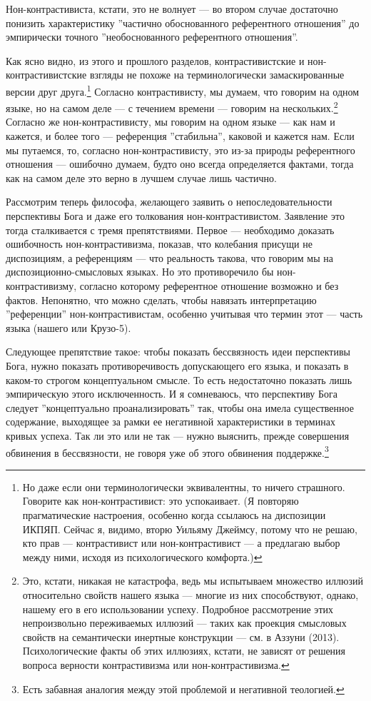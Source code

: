 \documentclass[11pt]{book}
\begin{document}
Нон-контрастивиста, кстати, это не волнует --- во втором случае достаточно понизить характеристику ''частично обоснованного референтного отношения'' до эмпирически точного ''необоснованного референтного отношения''.

Как ясно видно, из этого и прошлого разделов, контрастивистские и нон-контрастивистские взгляды не похоже на терминологически замаскированные версии друг друга.\footnote{Но даже если они терминологически эквивалентны, то ничего страшного. Говорите как нон-контрастивист: это успокаивает. (Я повторяю прагматические настроения, особенно когда ссылаюсь на диспозиции ИКПЯП. Сейчас я, видимо, вторю Уильяму Джеймсу, потому что не решаю, кто прав --- контрастивист или нон-контрастивист --- а предлагаю выбор между ними, исходя из психологического комфорта.)} Согласно контрастивисту, мы думаем, что говорим на одном языке, но на самом деле --- с течением времени --- говорим на нескольких.\footnote{Это, кстати, никакая не катастрофа, ведь мы испытываем множество иллюзий относительно свойств нашего языка --- многие из них способствуют, однако, нашему его в его использовании успеху. Подробное рассмотрение этих непроизвольно переживаемых иллюзий --- таких как проекция смысловых свойств на семантически инертные конструкции --- см. в Аззуни (2013). Психологические факты об этих иллюзиях, кстати, не зависят от решения вопроса верности контрастивизма или нон-контрастивизма.} Согласно же нон-контрастивисту, мы говорим на одном языке --- как нам и кажется, и более того --- референция ''стабильна'', каковой и кажется нам. Если мы путаемся, то, согласно нон-контрастивисту, это из-за природы референтного отношения --- ошибочно думаем, будто оно всегда определяется фактами, тогда как на самом деле это верно в лучшем случае лишь частично.

Рассмотрим теперь философа, желающего заявить о непоследовательности перспективы Бога и даже его толкования нон-контрастивистом. Заявление это тогда сталкивается с тремя препятствиями. Первое --- необходимо доказать ошибочность нон-контрастивизма, показав, что колебания присущи не диспозициям, а референциям --- что реальность такова, что говорим мы на диспозиционно-смысловых языках. Но это противоречило бы нон-контрастивизму, согласно которому референтное отношение возможно и без фактов. Непонятно, что можно сделать, чтобы навязать интерпретацию ''референции'' нон-контрастивистам, особенно учитывая что термин этот --- часть языка (нашего или Крузо-5).

Следующее препятствие такое: чтобы показать бессвязность идеи перспективы Бога, нужно показать противоречивость допускающего его языка, и показать в каком-то строгом концептуальном смысле. То есть недостаточно показать лишь эмпирическую этого исключенность. И я сомневаюсь, что перспективу Бога следует ''концептуально проанализировать'' так, чтобы она имела существенное содержание, выходящее за рамки ее негативной характеристики в терминах кривых успеха. Так ли это или не так --- нужно выяснить, прежде совершения обвинения в бессвязности, не говоря уже об этого обвинения поддержке.\footnote{Есть забавная аналогия между этой проблемой и негативной теологией.}
\end{document}

